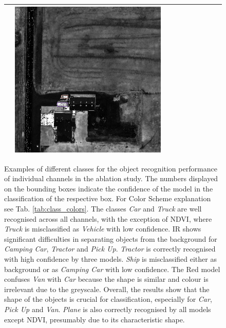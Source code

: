 \begin{figure}[h!]
\begin{tabularx}{\textwidth}{c|*{9}{X}}
    & \includegraphics[trim={300pt 355pt 610pt 570pt},clip,width=\linewidth]{images/015Results/03ablation/comp_images/ndvi/198.png} \\ \hline
\end{tabularx}
\caption[Ablation Studies: Examples of different classes for the object recognition performance]{Examples of different classes for the object recognition performance of individual channels in the ablation study. The numbers displayed on the bounding boxes indicate the confidence of the model in the classification of the respective box. For Color Scheme explanation see Tab. \ref{tab:class_colors}. The classes \textit{Car} and \textit{Truck} are well recognised across all channels, with the exception of NDVI, where \textit{Truck} is misclassified as \textit{Vehicle} with low confidence. IR shows significant difficulties in separating objects from the background for \textit{Camping Car}, \textit{Tractor} and \textit{Pick Up}. \textit{Tractor} is correctly recognised with high confidence by three models. \textit{Ship} is misclassified either as background or as \textit{Camping Car} with low confidence. The Red model confuses \textit{Van} with \emph{Car} because the shape is similar and colour is irrelevant due to the greyscale. Overall, the results show that the shape of the objects is crucial for classification, especially for \textit{Car}, \textit{Pick Up} and \textit{Van}. \textit{Plane} is also correctly recognised by all models except NDVI, presumably due to its characteristic shape.}
\label{fig:ablation_example_pics}
\end{figure}
